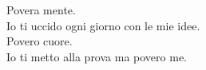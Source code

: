 
Povera mente.\\
Io ti uccido ogni giorno con le mie idee.\\
Povero cuore. \\
Io ti metto alla prova ma povero me.